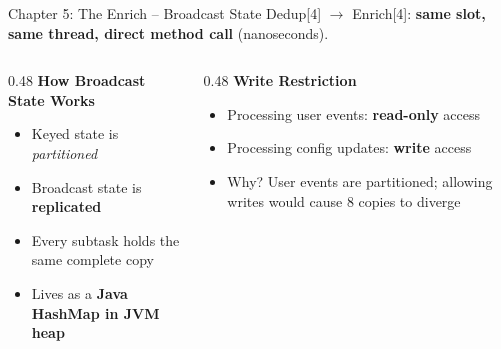 \documentclass[aspectratio=169]{beamer}
\begin{document}

\begin{frame}{Chapter 5: The Enrich -- Broadcast State}
    Dedup[4] $\rightarrow$ Enrich[4]: \textbf{same slot, same thread, direct method call} (nanoseconds).

    \vspace{0.3cm}
    \begin{columns}[T]
        \begin{column}{0.48\textwidth}
            \textbf{How Broadcast State Works}
            \begin{itemize}
                \item Keyed state is \textit{partitioned}
                \item Broadcast state is \textbf{replicated}
                \item Every subtask holds the same complete copy
                \item Lives as a \textbf{Java HashMap in JVM heap}
            \end{itemize}
        \end{column}
        \begin{column}{0.48\textwidth}
            \textbf{Write Restriction}
            \begin{itemize}
                \item Processing user events: \textbf{read-only} access
                \item Processing config updates: \textbf{write} access
                \item Why? User events are partitioned; allowing writes would cause 8 copies to diverge
            \end{itemize}
        \end{column}
    \end{columns}
\end{frame}
\end{document}
